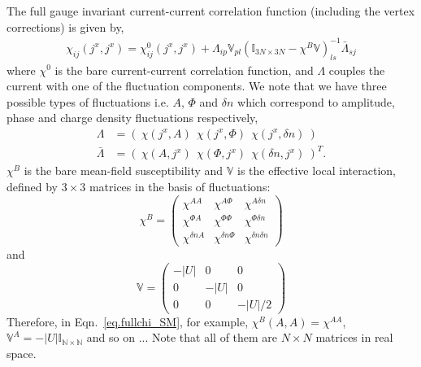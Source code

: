 \documentclass[Colective.tex]{revtex4-1}
\begin{document}
\indent The full gauge invariant current-current correlation function (including the vertex corrections) is given by,
\begin{align}
\chi_{ij}\left(j^x,j^x\right) = \chi^0_{ij}\left(j^x,j^x\right) + \Lambda_{ip}\mathbb{V}_{pl} \left(\mathbb{I}_{3N\times 3N}-\chi^B \mathbb{V}\right)^{-1}_{ls}\bar{\Lambda}_{sj}
\label{eq.fullchi_SM}
\end{align}
where $\chi^0$ is the bare current-current correlation function, and $\Lambda$ couples the current with one of the fluctuation components. We note that we have three possible types of fluctuations i.e. $A$, $\Phi$ and $\delta n$ which correspond to amplitude, phase and charge density fluctuations respectively,
\begin{align}
\Lambda&=\left(~\chi(j^x,A)~~\chi(j^x,\Phi)~~\chi(j^x,\delta n)~\right)\\
\bar{\Lambda}&=\left(~\chi(A,j^x)~~\chi(\Phi,j^x)~~\chi(\delta n,j^x)~\right)^T.
\end{align}
$\chi^B$ is the bare mean-field susceptibility and $\mathbb V$ is the effective local interaction, defined by $3\times3$ matrices in the basis of fluctuations:
\begin{equation}
\chi^B = 
\left(\begin{array}{ccc}
\chi^{AA} & \chi^{A\Phi} & \chi^{A\delta n} \\
\chi^{\Phi A} & \chi^{\Phi \Phi} & \chi^{\Phi \delta n} \\
\chi^{\delta n A} & \chi^{\delta n\Phi} & \chi^{\delta n\delta n}
\end{array}\right)
\end{equation}
and 
\begin{equation}
\mathbb{V} = 
\left(\begin{array}{ccc}
-|U| & 0 & 0 \\
0 & -|U| & 0 \\
0 & 0 & -|U|/2
\end{array}\right)
\end{equation}
Therefore, in Eqn.~\eqref{eq.fullchi_SM}, for example, $\chi^B(A,A)=\chi^{AA}$, $\mathbb{V}^A=-|U|\mathbb{I_{N\times N}}$ and so on ... Note that all of them are $N\times N$ matrices in real space.\\
\end{document}

